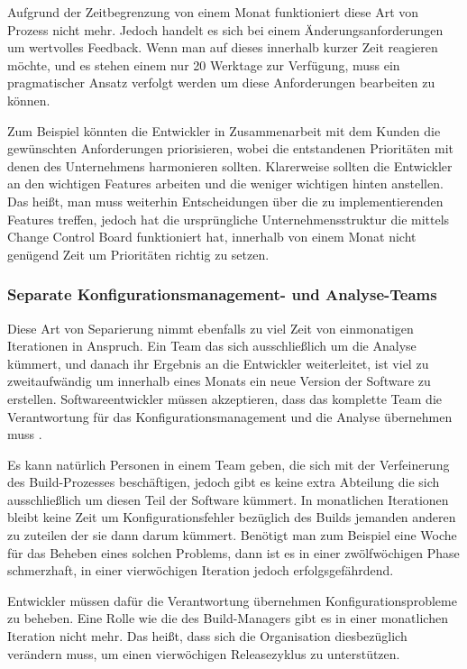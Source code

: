 Aufgrund der Zeitbegrenzung von einem Monat funktioniert diese Art von Prozess nicht mehr. Jedoch handelt es sich bei einem Änderungsanforderungen um wertvolles Feedback. Wenn man auf dieses innerhalb kurzer Zeit reagieren möchte, und es stehen einem nur 20 Werktage zur Verfügung, muss ein pragmatischer Ansatz verfolgt werden um diese Anforderungen bearbeiten zu können. 

Zum Beispiel könnten die Entwickler in Zusammenarbeit mit dem Kunden die gewünschten Anforderungen priorisieren, wobei die entstandenen Prioritäten mit denen des Unternehmens harmonieren sollten. Klarerweise sollten die Entwickler an den wichtigen Features arbeiten und die weniger wichtigen hinten anstellen. Das heißt, man muss weiterhin Entscheidungen über die zu implementierenden Features treffen, jedoch hat die ursprüngliche Unternehmensstruktur die mittels Change Control Board funktioniert hat, innerhalb von einem Monat nicht genügend Zeit um Prioritäten richtig zu setzen.

\subsubsection{Separate Konfigurationsmanagement- und Analyse-Teams}
Diese Art von Separierung nimmt ebenfalls zu viel Zeit von einmonatigen Iterationen in Anspruch. Ein Team das sich ausschließlich um die Analyse kümmert, und danach ihr Ergebnis an die Entwickler weiterleitet, ist viel zu zweitaufwändig um innerhalb eines Monats ein neue Version der Software zu erstellen. Softwareentwickler müssen akzeptieren, dass das komplette Team die Verantwortung für das Konfigurationsmanagement und die Analyse übernehmen muss \cite{dpunktkonfig2008}.

Es kann natürlich Personen in einem Team geben, die sich mit der Verfeinerung des Build-Prozesses beschäftigen, jedoch gibt es keine extra Abteilung die sich ausschließlich um diesen Teil der Software kümmert. In monatlichen Iterationen bleibt keine Zeit um Konfigurationsfehler bezüglich des Builds jemanden anderen zu zuteilen der sie dann darum kümmert. Benötigt man zum Beispiel eine Woche für das Beheben eines solchen Problems, dann ist es in einer zwölfwöchigen Phase schmerzhaft, in einer vierwöchigen Iteration jedoch erfolgsgefährdend. 

Entwickler müssen dafür die Verantwortung übernehmen Konfigurationsprobleme zu beheben. Eine Rolle wie die des Build-Managers gibt es in einer monatlichen Iteration nicht mehr. Das heißt, dass sich die Organisation diesbezüglich verändern muss, um einen vierwöchigen Releasezyklus zu unterstützen.
